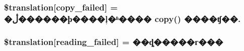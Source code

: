 \subsubsection[{\$translation}]{\setlength{\rightskip}{0pt plus 5cm}\$translation\mbox{[}\textquotesingle{}copy\+\_\+failed\textquotesingle{}\mbox{]} = \textquotesingle{}�ڷ������ϸ����ļ�ʱ���� copy() ����ʧ��.\textquotesingle{}}\label{class_8upload_8zh___c_n_8gb-2312_8php_a783c9358bcf54a054545b50098bc679b}
\hypertarget{class_8upload_8zh___c_n_8gb-2312_8php_a01bea14c9fd5f353f62db44beabfcd42}{}
\subsubsection[{\$translation}]{\setlength{\rightskip}{0pt plus 5cm}\$translation\mbox{[}\textquotesingle{}reading\+\_\+failed\textquotesingle{}\mbox{]} = \textquotesingle{}��ȡ�����г���\textquotesingle{}}\label{class_8upload_8zh___c_n_8gb-2312_8php_a01bea14c9fd5f353f62db44beabfcd42}

